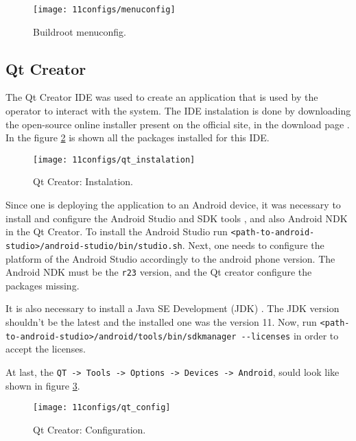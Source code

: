 \begin{figure}[H]
	\centering	
	\texttt{[image: 11configs/menuconfig]}
	\caption{Buildroot menuconfig.}
	\label{fig:menuconfig}
\end{figure}

\subsection{Qt Creator}

The Qt Creator IDE was used to create an application that is used by the operator to interact with the system. The IDE instalation is done by downloading the open-source online installer present on the official site, in the download page \cite{qt_creator}. In the figure \ref{fig:qt_instalation} is shown all the packages installed for this IDE.

\begin{figure}[H]
	\centering	
	\texttt{[image: 11configs/qt\_instalation]}
	\caption{Qt Creator: Instalation.}
	\label{fig:qt_instalation}
\end{figure}

Since one is deploying the application to an Android device, it was necessary to install and configure the Android Studio and SDK tools \cite{android_studio}, and also Android NDK \cite{android_ndk} in the Qt Creator. To install the Android Studio run \verb|<path-to-android-studio>/android-studio/bin/studio.sh|. Next, one needs to configure the platform of the Android Studio accordingly to the android phone version. The Android NDK must be the \verb|r23| version, and the Qt creator configure the packages missing.

It is also necessary to install a Java SE Development (JDK) \cite{java}. The JDK version shouldn't be the latest and the installed one was the version 11. Now, run \verb|<path-to-android-studio>/android/tools/bin/sdkmanager --licenses| in order to accept the licenses. 

At last, the \verb|QT -> Tools -> Options -> Devices -> Android|, sould look like shown in figure \ref{fig:qt_config}.

\begin{figure}[H]
	\centering	
	\texttt{[image: 11configs/qt\_config]}
	\caption{Qt Creator: Configuration.}
	\label{fig:qt_config}
\end{figure}

